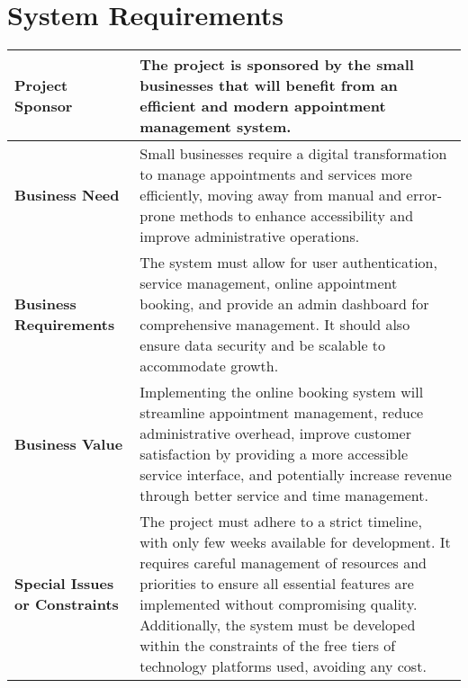 \section{System Requirements}
\label{sec:system-requirements}
    \large
    \begin{tabular}{m{}|m{}}
        \textbf{Project Sponsor} & The project is sponsored by the small businesses that will benefit from an efficient and modern appointment management system. \\\hline
        \textbf{Business Need} & Small businesses require a digital transformation to manage appointments and services more efficiently, moving away from manual and error-prone methods to enhance accessibility and improve administrative operations. \\\hline
        \textbf{Business Requirements} & The system must allow for user authentication, service management, online appointment booking, and provide an admin dashboard for comprehensive management. It should also ensure data security and be scalable to accommodate growth. \\\hline
        \textbf{Business Value} & Implementing the online booking system will streamline appointment management, reduce administrative overhead, improve customer satisfaction by providing a more accessible service interface, and potentially increase revenue through better service and time management. \\\hline
        \textbf{Special Issues or Constraints} & The project must adhere to a strict timeline, with only few weeks available for development. It requires careful management of resources and priorities to ensure all essential features are implemented without compromising quality. Additionally, the system must be developed within the constraints of the free tiers of technology platforms used, avoiding any cost.


    \end{tabular}